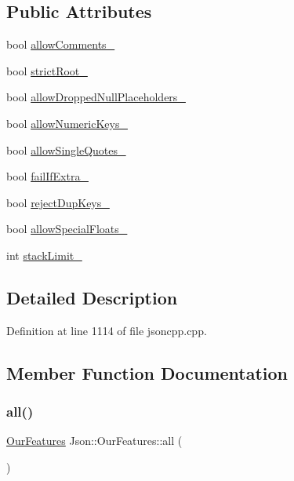 \subsection*{Public Attributes}
\begin{DoxyCompactItemize}
\item 
bool \hyperlink{class_json_1_1_our_features_ac71bb7ba7363d3b05ed76602b036ce33}{allow\+Comments\+\_\+}
\item 
bool \hyperlink{class_json_1_1_our_features_a2095f66a776c0a4ae6cc931a0c94242e}{strict\+Root\+\_\+}
\item 
bool \hyperlink{class_json_1_1_our_features_a13963bc44bf948eec1968f7ff8e8f5f1}{allow\+Dropped\+Null\+Placeholders\+\_\+}
\item 
bool \hyperlink{class_json_1_1_our_features_af6973fc7e774ce2d634ba99442aeb91a}{allow\+Numeric\+Keys\+\_\+}
\item 
bool \hyperlink{class_json_1_1_our_features_abbd6c196d7a22e2a360a59887eda4610}{allow\+Single\+Quotes\+\_\+}
\item 
bool \hyperlink{class_json_1_1_our_features_ae8ad25b90706c78f1a8fe929191ac61b}{fail\+If\+Extra\+\_\+}
\item 
bool \hyperlink{class_json_1_1_our_features_a39b8e0b86b1c24a45e800c023bb715aa}{reject\+Dup\+Keys\+\_\+}
\item 
bool \hyperlink{class_json_1_1_our_features_af760f91cc2a7af37e44f78fb466061bb}{allow\+Special\+Floats\+\_\+}
\item 
int \hyperlink{class_json_1_1_our_features_a9a786713902d14be6d57a08cc03ccfff}{stack\+Limit\+\_\+}
\end{DoxyCompactItemize}


\subsection{Detailed Description}


Definition at line 1114 of file jsoncpp.\+cpp.



\subsection{Member Function Documentation}
\mbox{\label{class_json_1_1_our_features_a0686e1406b6677f496529f9f3fe98d1e}} 
\subsubsection{\texorpdfstring{all()}{all()}}
{\footnotesize\ttfamily \hyperlink{class_json_1_1_our_features}{Our\+Features} Json\+::\+Our\+Features\+::all (\begin{DoxyParamCaption}{ }\end{DoxyParamCaption})\hspace{0.3cm}{\ttfamily [static]}}



